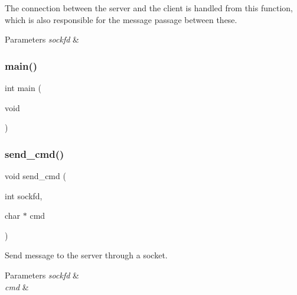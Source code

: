 The connection between the server and the client is handled from this function, which is also responsible for the message passage between these. 


\begin{DoxyParams}{Parameters}
{\em sockfd} & \\
\hline
\end{DoxyParams}
\mbox{\label{client_8c_ae66f6b31b5ad750f1fe042a706a4e3d4}} 
\subsubsection{main()}
{\footnotesize\ttfamily int main (\begin{DoxyParamCaption}\item[{void}]{ }\end{DoxyParamCaption})}

\mbox{\label{client_8c_a4117102389756aee8467678b28f484ed}} 
\subsubsection{send\+\_\+cmd()}
{\footnotesize\ttfamily void send\+\_\+cmd (\begin{DoxyParamCaption}\item[{int}]{sockfd,  }\item[{char $\ast$}]{cmd }\end{DoxyParamCaption})}



Send message to the server through a socket. 


\begin{DoxyParams}{Parameters}
{\em sockfd} & \\
\hline
{\em cmd} & \\
\hline
\end{DoxyParams}
